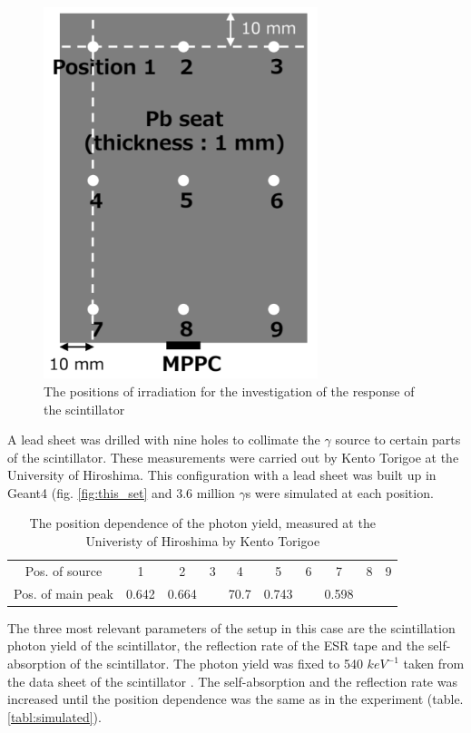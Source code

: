 \documentclass[12pt, a4paper,titlepage]{article}
\numberwithin{equation}{section}
\numberwithin{figure}{section}
\begin{document}
\begin{figure}[h!]
\centering
\includegraphics[width=80.0mm]{images/positions.png}
\caption{The positions of irradiation for the investigation of the response of the scintillator  \cite{kento}}
\end{figure}

A lead sheet was drilled with nine holes to collimate the $\gamma$ source to certain parts of the scintillator. These measurements were carried out by Kento Torigoe at the University of Hiroshima. This configuration with a lead sheet was built up in Geant4 (fig. \ref{fig:this_set} and 3.6 million $\gamma$s were simulated at each position. 

\begin{table}[h!]
\begin{center}
\begin{tabular}{ |c|c|c|c|c|c|c|c|c|c| } 
 \hline
  Pos. of source & 1 & 2 & 3 & 4 & 5 & 6 & 7 & 8 & 9 \\ 
  Pos. of main peak & 0.642 & 0.664 & & 70.7 & 0.743 & & 0.598 & &  \\ 
 \hline
\end{tabular}
\label{tab:exp_sim}
\caption{The position dependence of the photon yield, measured at the Univeristy of Hiroshima by Kento Torigoe}
\end{center}
\end{table}

The three most relevant parameters of the setup in this case are the scintillation photon yield of the scintillator, the reflection rate of the ESR tape and the self-absorption of the scintillator. The photon yield was fixed to 540 $keV^{-1}$ taken from the data sheet of the scintillator \cite{scinti}. The self-absorption and the reflection rate was increased until the position dependence was the same as in the experiment (table. \ref{tabl:simulated}). 
\end{document}
